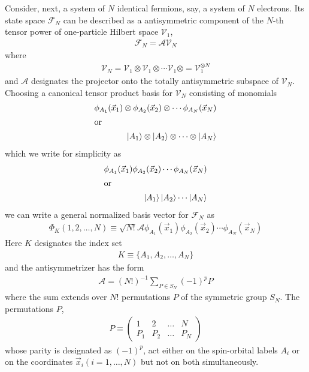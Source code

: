 \documentclass{book}
\renewcommand{\ket}[1]{\Ket{#1}}
\begin{document}
Consider, next, a system of $N$ identical fermions, say, a system of $N$ electrons. Its state space $\mathcal{F}_N$ can be described as a antisymmetric component of the $N$-th tensor power of one-particle Hilbert space $\mathcal{V}_1$,
\begin{align}
    \mathcal{F}_N=\mathcal{A}\mathcal{V}_N
\end{align}
where
\begin{align}
    \mathcal{V}_N=\mathcal{V}_1\otimes\mathcal{V}_1\otimes\cdots\mathcal{V}_1\otimes=\mathcal{V}_1^{\otimes N}
\end{align}
and $\mathcal{A}$ designates the projector onto the totally antisymmetric subspace of $\mathcal{V}_N$. Choosing a canonical tensor product basis for $\mathcal{V}_N$ consisting of monomials
\begin{subequations}
    \begin{align}
        \phi_{A_1}(\vec{x}_1)\otimes\phi_{A_2}(\vec{x}_2)\otimes\cdots\phi_{A_N}(\vec{x}_N)\\
        \intertext{or}
        \ket{A_1}\otimes\ket{A_2}\otimes\cdots\otimes\ket{A_N}
    \end{align}
\end{subequations}
which we write for simplicity as 
\begin{subequations}
    \begin{align}
        \phi_{A_1}(\vec{x}_1)\phi_{A_2}(\vec{x}_2)\cdots\phi_{A_N}(\vec{x}_N)\\
        \intertext{or}
        \ket{A_1}\ket{A_2}\cdots\ket{A_N}
        \label{eq:9b}
    \end{align}
\end{subequations}
we can write a general normalized basis vector for $\mathcal{F}_N$ as 
\begin{align}
    \Phi_K(1,2,\ldots,N) \equiv \sqrt{N!} \mathcal{A}\phi_{A_1}(\vec{x}_1)\phi_{A_2}(\vec{x}_2)\cdots\phi_{A_N}(\vec{x}_N)
    \label{eq:10}
\end{align}
Here $K$ designates the index set 
\begin{align}
    K\equiv\{A_1,A_2,\ldots,A_N\}
    \label{eq:11}
\end{align}
and the antisymmetrizer has the  form
\begin{align}
    \mathcal{A}=(N!)^{-1}\sum_{P\in S_N}(-1)^{p}P
\end{align}
where the sum extends over $N!$ permutations $P$ of the symmetric group $S_N$. The permutations $P$, 
\begin{align}
    P \equiv
    \begin{pmatrix}
        1 & 2 & \ldots & N\\
        P_1&P_2&\ldots&P_N
    \end{pmatrix}
\end{align}
whose parity is designated as $(-1)^p$, act either on the spin-orbital labels $A_i$ or on the coordinates $\vec{x}_i (i=1,\ldots,N)$ but not on both simultaneously.
\end{document}
